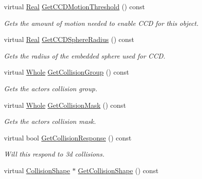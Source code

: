 \begin{DoxyCompactItemize}
virtual \hyperlink{namespacephys_af7eb897198d265b8e868f45240230d5f}{Real} \hyperlink{classphys_1_1ActorBasePhysicsSettings_a6a18543f51468142b44d3c72fc9d75a0}{GetCCDMotionThreshold} () const 
\begin{DoxyCompactList}\small\item\em Gets the amount of motion needed to enable CCD for this object. \item\end{DoxyCompactList}\item 
virtual \hyperlink{namespacephys_af7eb897198d265b8e868f45240230d5f}{Real} \hyperlink{classphys_1_1ActorBasePhysicsSettings_a523e95116bc3dd5d7a114c96639fe483}{GetCCDSphereRadius} () const 
\begin{DoxyCompactList}\small\item\em Gets the radius of the embedded sphere used for CCD. \item\end{DoxyCompactList}\item 
virtual \hyperlink{namespacephys_a460f6bc24c8dd347b05e0366ae34f34a}{Whole} \hyperlink{classphys_1_1ActorBasePhysicsSettings_a6090c93f35beea7c82550076a17aef24}{GetCollisionGroup} () const 
\begin{DoxyCompactList}\small\item\em Gets the actors collision group. \item\end{DoxyCompactList}\item 
virtual \hyperlink{namespacephys_a460f6bc24c8dd347b05e0366ae34f34a}{Whole} \hyperlink{classphys_1_1ActorBasePhysicsSettings_a8a3a7ca225dd9697495bcc7d51b0942a}{GetCollisionMask} () const 
\begin{DoxyCompactList}\small\item\em Gets the actors collision mask. \item\end{DoxyCompactList}\item 
virtual bool \hyperlink{classphys_1_1ActorBasePhysicsSettings_aa131aa28b9e5c7a53c65c4e229f13ed1}{GetCollisionResponse} () const 
\begin{DoxyCompactList}\small\item\em Will this respond to 3d collisions. \item\end{DoxyCompactList}\item 
virtual \hyperlink{classphys_1_1CollisionShape}{CollisionShape} $\ast$ \hyperlink{classphys_1_1ActorBasePhysicsSettings_ae436b1edd205b48225590dab21eb3551}{GetCollisionShape} () const 

\end{DoxyCompactItemize}
